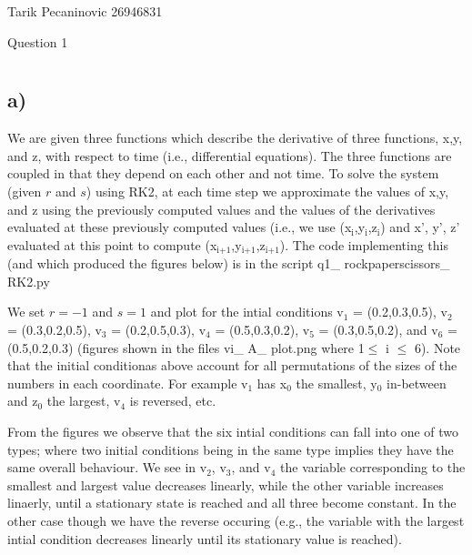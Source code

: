 \documentclass[11pt]{article}
\date{\today}
\title{}
\begin{document}
\tableofcontents

Tarik Pecaninovic 26946831

Question 1

\section{}
\label{sec:orgdb32c56}
\subsection{a)}
\label{sec:orge40f223}

We are given three functions which describe the derivative of three functions, x,y, and z, with respect to time (i.e., differential equations). 
The three functions are coupled in that they depend on each other and not time. To solve the system (given \(r\) and \(s\)) using RK2, at each time step
we approximate the values of x,y, and z using the previously computed values and the values of the derivatives evaluated at these previously computed
values (i.e., we use (x\(_{\text{i}}\),y\(_{\text{i}}\),z\(_{\text{i}}\)) and x', y', z' evaluated at this point to compute (x\(_{\text{i+1}}\),y\(_{\text{i+1}}\),z\(_{\text{i+1}}\)). The code implementing this (and which produced
the figures below) is in the script q1\_ rockpaperscissors\_ RK2.py


We set \(r=-1\) and \(s=1\) and plot for the intial conditions v\(_{\text{1}}\) = (0.2,0.3,0.5), v\(_{\text{2}}\) = (0.3,0.2,0.5), v\(_{\text{3}}\) = (0.2,0.5,0.3), v\(_{\text{4}}\) = (0.5,0.3,0.2), v\(_{\text{5}}\) = (0.3,0.5,0.2), and v\(_{\text{6}}\) = (0.5,0.2,0.3)
(figures shown in the files vi\_ A\_ plot.png where 1\(\le\) i \(\le\) 6). Note that the initial conditionas above account for all permutations of the sizes of the numbers in each coordinate. For
example v\(_{\text{1}}\) has x\(_{\text{0}}\) the smallest, y\(_{\text{0}}\) in-between and z\(_{\text{0}}\) the largest, v\(_{\text{4}}\) is reversed, etc.

From the figures we observe that the six intial conditions can fall into one of two types; where two initial conditions being in the same type implies they have the same overall behaviour.
We see in v\(_{\text{2}}\), v\(_{\text{3}}\), and v\(_{\text{4}}\) the variable corresponding to the smallest and largest value decreases linearly, while the other variable increases linaerly, until a stationary state is reached
and all three become constant. In the other case though we have the reverse occuring (e.g., the variable with the largest intial condition decreases linearly until its stationary value is reached).
\end{document}
